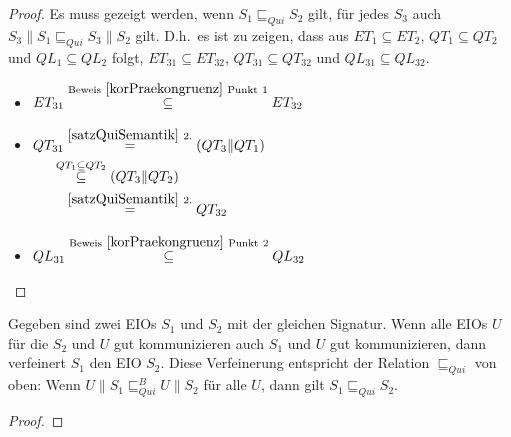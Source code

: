 \begin{proof}
  Es muss gezeigt werden, wenn $S_1\sqsubseteq _{Qui} S_2$ gilt,  für   jedes $
  S_3$ auch $S_3\|S_1\sqsubseteq _{Qui} S_3\|S_2$ gilt. D.h.\ es ist zu zeigen,
  dass aus $ET_1\subseteq ET_2$, $QT_1\subseteq QT_2$ und $QL_1\subseteq QL_2$
  folgt, $ET_{31}\subseteq ET_{32}$, $QT_{31}\subseteq QT_{32}$ und
  $QL_{31}\subseteq QL_{32}$.
  \begin{itemize}
    \item $\begin{aligned}[t]
        ET_{31} \overset{\mathrm{Beweis}~\ref{korPraekongruenz}
        ~\mathrm{Punkt}~1}{\subseteq} ET_{32}
    \end{aligned}$
    \item $\begin{aligned}[t]
        QT_{31} &\overset{\ref{satzQuiSemantik}~2.}{=} (QT_3\|QT_1)\\
                &\hspace{-0.3cm}\overset{QT_1\subseteq QT_2}{\subseteq} (QT_3\|QT_2)\\
                &\overset{\ref{satzQuiSemantik}~2.}{=} QT_{32}
    \end{aligned}$
    \item $\begin{aligned}[t]
        QL_{31} \overset{\mathrm{Beweis}~\ref{korPraekongruenz}
        ~\mathrm{Punkt}~2}{\subseteq} QL_{32}
    \end{aligned}$
  \end{itemize}
\end{proof}

\begin{lem}
  Gegeben sind zwei EIOs $S_1$ und $S_2$ mit der gleichen Signatur. Wenn alle
  EIOs $U$ für die $S_2$ und $U$ gut kommunizieren auch $S_1$ und $U$ gut
  kommunizieren, dann verfeinert $S_1$ den EIO $S_2$. Diese Verfeinerung
  entspricht der Relation $\sqsubseteq _{Qui}$ von oben: Wenn
  $U\|S_1\sqsubseteq _{Qui}^B U\|S_2$ für alle $U$, dann gilt $S_1\sqsubseteq
  _{Qui} S_2$.
\end{lem}

\begin{proof}
  
\end{proof}
